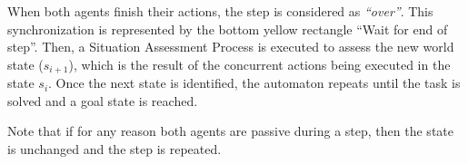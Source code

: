 When both agents finish their actions, the step is considered as \textit{``over''}. This synchronization is represented by the bottom yellow rectangle ``Wait for end of step''. Then, a Situation Assessment Process is executed to assess the new world state ($s_{i+1}$), which is the result of the concurrent actions being executed in the state $s_i$. Once the next state is identified, the automaton repeats until the task is solved and a goal state is reached.

Note that if for any reason both agents are passive during a step, then the state is unchanged and the step is repeated. 




